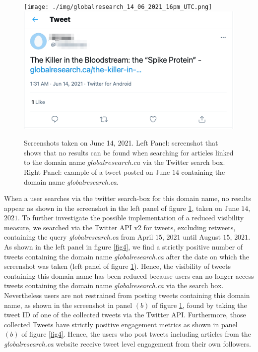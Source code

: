 \documentclass{article}
\begin{document}
\begin{figure}[h]
	\centering
	\texttt{[image: ./img/globalresearch\_14\_06\_2021\_16pm\_UTC.png]} 
	\includegraphics[scale=0.32]{./img/globalresearch/tweet.png} 

	\caption{Screenshots taken on June 14, 2021. Left Panel: screenshot that shows that no results can be found when searching for articles linked to the domain name $globalresearch.ca$ via the Twitter search box. Right Panel: example of a tweet posted on June $14$ containing the domain name {\it globalresearch.ca}. }
		\label{fig3}
\end{figure}

\smallskip

When a user searches via the twitter search-box for this domain name, no results appear as shown in the screenshot in the left panel of figure \ref{fig3}, taken on June $14$, $2021$. To further investigate the possible implementation of a reduced visibility measure, we searched via the Twitter API v2 for tweets, excluding retweets, containing the query {\it globalresearch.ca} from April $15$, $2021$ until August $15$, $2021$.  As shown in the left panel in figure \ref{fig4}, we find a strictly positive number of tweets containing the domain name {\it globalresearch.ca} after the date on which the screenshot was taken (left panel of figure \ref{fig3}). Hence, the visibility of tweets containing this domain name has been reduced because users can no longer access tweets containing the domain name {\it globalresearch.ca} via the search box. Nevertheless users are not restrained from posting tweets containing this domain name, as shown in the screenshot in panel $(b)$ of figure \ref{fig3}, found by taking the tweet ID of one of the collected tweets via the Twitter API. Furthermore, those collected Tweets have strictly positive engagement metrics as shown in panel $(b)$ of figure \ref{fig4}. Hence, the users who post tweets including articles from the {\it globalresearch.ca} website receive tweet level engagement from their own followers. 
\end{document}
